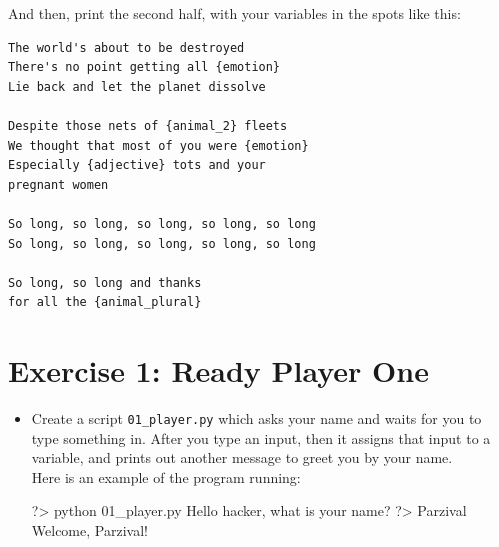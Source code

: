 \documentclass{42-en}
\begin{document}
And then, print the second half, with your variables in the spots like this:\\
\begin{verbatim}
The world's about to be destroyed
There's no point getting all {emotion}
Lie back and let the planet dissolve

Despite those nets of {animal_2} fleets
We thought that most of you were {emotion}
Especially {adjective} tots and your
pregnant women

So long, so long, so long, so long, so long
So long, so long, so long, so long, so long

So long, so long and thanks
for all the {animal_plural}
\end{verbatim}

\nextexercice
\newpage


\chapter{Exercise 1: Ready Player One}
\makeheaderfiles

\begin{itemize}

\item Create a script \texttt{01\_player.py} which asks your name and waits for you to type something in. After you type an input, then it assigns that input to a variable, and prints out another message to greet you by your name.\\

Here is an example of the program running:
\begin{42console}
	?> python 01_player.py
	Hello hacker, what is your name?
	?> Parzival
	Welcome, Parzival!
\end{42console}

\end{itemize}
\end{document}
